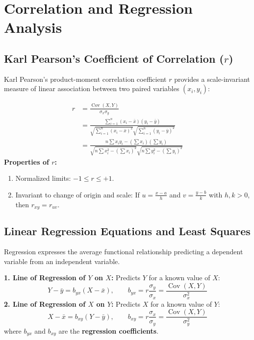 \documentclass[12pt,a4paper]{article}
\begin{document}
\section{Correlation and Regression Analysis}

\subsection{Karl Pearson's Coefficient of Correlation ($r$)}
Karl Pearson's product-moment correlation coefficient $r$ provides a scale-invariant measure of linear association between two paired variables $(x_i, y_i)$:
\begin{tcolorbox}[formulabox, title={\textbf{Formula for Pearson's Correlation Coefficient}}]
\begin{equation}
  \begin{aligned}
    r &= \frac{\operatorname{Cov}(X, Y)}{\sigma_x \sigma_y} \\[3pt]
    &= \frac{\displaystyle\sum_{i=1}^n (x_i - \bar{x})(y_i - \bar{y})}{\sqrt{\displaystyle\sum_{i=1}^n (x_i - \bar{x})^2} \sqrt{\displaystyle\sum_{i=1}^n (y_i - \bar{y})^2}} \\[3pt]
    &= \frac{n \sum x_i y_i - (\sum x_i)(\sum y_i)}{\sqrt{n\sum x_i^2 - (\sum x_i)^2}\sqrt{n\sum y_i^2 - (\sum y_i)^2}}
  \end{aligned}
\end{equation}
\textbf{Properties of $r$:}
\begin{enumerate}[leftmargin=*, itemsep=2pt]
  \item Normalized limits: $-1 \le r \le +1$.
  \item Invariant to change of origin and scale: If $u = \frac{x - a}{h}$ and $v = \frac{y - b}{k}$ with $h, k > 0$, then $r_{xy} = r_{uv}$.
\end{enumerate}
\end{tcolorbox}

\subsection{Linear Regression Equations and Least Squares}
Regression expresses the average functional relationship predicting a dependent variable from an independent variable.
\begin{tcolorbox}[defbox, title={\textbf{The Two Lines of Regression}}]
\textbf{1. Line of Regression of $Y$ on $X$:} Predicts $Y$ for a known value of $X$:
\begin{equation}
  Y - \bar{y} = b_{yx} (X - \bar{x}), \qquad b_{yx} = r \frac{\sigma_y}{\sigma_x} = \frac{\operatorname{Cov}(X, Y)}{\sigma_x^2}
\end{equation}
\textbf{2. Line of Regression of $X$ on $Y$:} Predicts $X$ for a known value of $Y$:
\begin{equation}
  X - \bar{x} = b_{xy} (Y - \bar{y}), \qquad b_{xy} = r \frac{\sigma_x}{\sigma_y} = \frac{\operatorname{Cov}(X, Y)}{\sigma_y^2}
\end{equation}
where $b_{yx}$ and $b_{xy}$ are the \textbf{regression coefficients}.
\end{tcolorbox}
\end{document}
